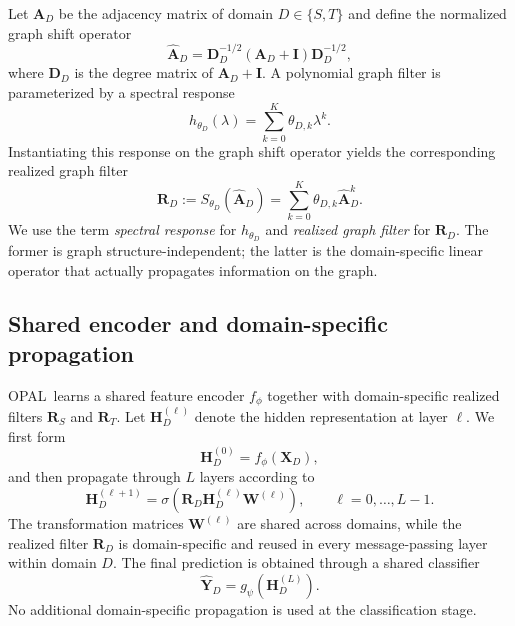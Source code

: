 \documentclass[runningheads]{llncs}
\newcommand{\model}{OPAL}
\def\mA{{\mathbf{A}}}
\def\mD{{\mathbf{D}}}
\def\mH{{\mathbf{H}}}
\def\mI{{\mathbf{I}}}
\def\mR{{\mathbf{R}}}
\def\mW{{\mathbf{W}}}
\def\mX{{\mathbf{X}}}
\def\mY{{\mathbf{Y}}}
\begin{document}
Let $\mA_D$ be the adjacency matrix of domain ${D}\in\{S,T\}$ and define the normalized graph shift operator
\begin{equation}
\widehat{\mA}_D
=
\mD_D^{-1/2}(\mA_D+\mI)\mD_D^{-1/2},
\label{eq:gso_def}
\end{equation}
where $\mD_D$ is the degree matrix of $\mA_D+\mI$.
A polynomial graph filter is parameterized by a spectral response
\begin{equation}
h_{\theta_D}(\lambda)=\sum_{k=0}^{K}\theta_{D,k}\lambda^k.
\label{eq:spectral_response}
\end{equation}
Instantiating this response on the graph shift operator yields the corresponding realized graph filter
\begin{equation}
\mR_D
:=
S_{\theta_D}(\widehat{\mA}_D)
=
\sum_{k=0}^{K}\theta_{D,k}\widehat{\mA}_D^k.
\label{eq:realized_filter}
\end{equation}
We use the term \emph{spectral response} for $h_{\theta_D}$ and \emph{realized graph filter} for $\mR_D$. The former is graph structure-independent; the latter is the domain-specific linear operator that actually propagates information on the graph.

\subsection{Shared encoder and domain-specific propagation}

\model\ learns a shared feature encoder $f_\phi$ together with domain-specific realized filters $\mR_S$ and $\mR_T$. Let $\mH_D^{(\ell)}$ denote the hidden representation at layer $\ell$. We first form
\begin{equation}
\mH_D^{(0)} = f_\phi(\mX_D),
\label{eq:encoder_output}
\end{equation}
and then propagate through $L$ layers according to
\begin{equation}
\mH_D^{(\ell+1)}
=
\sigma\!\left(
\mR_D \mH_D^{(\ell)} \mW^{(\ell)}
\right),
\qquad \ell=0,\dots,L-1.
\label{eq:gnn_update}
\end{equation}
The transformation matrices $\mW^{(\ell)}$ are shared across domains, while the realized filter $\mR_D$ is domain-specific and reused in every message-passing layer within domain $D$. The final prediction is obtained through a shared classifier
\begin{equation}
\hat{\mY}_D = g_\psi(\mH_D^{(L)}).
\label{eq:prediction}
\end{equation}
No additional domain-specific propagation is used at the classification stage.
\end{document}
